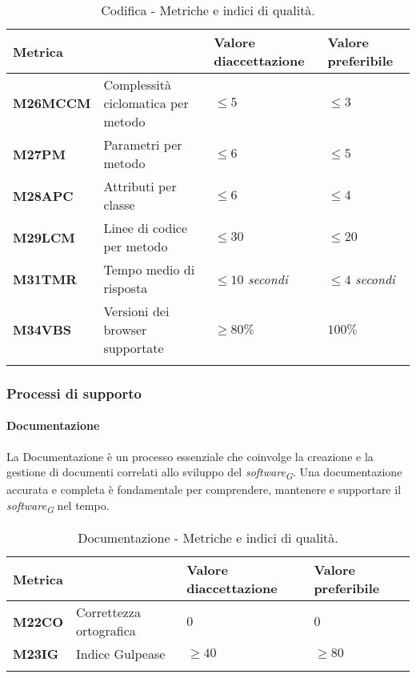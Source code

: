 \begin{longtable}{|C{1.9cm}|L{4cm}|L{2.2cm}|L{2.1cm}|}
    \hline
    \textbf{Metrica} &  & \textbf{Valore di\linebreak accettazione} & {\textbf{Valore \linebreak preferibile}} \\
    \hline \hline

    \textbf{M26MCCM} & Complessità ciclomatica per metodo & $\leq 5$ & $\leq 3$ \\
    \hline

    \textbf{M27PM} & Parametri per metodo & $\leq 6$ & $\leq 5$ \\
    \hline

    \textbf{M28APC} & Attributi per classe & $\leq 6$ & $\leq 4$ \\
    \hline

    \textbf{M29LCM} & Linee di codice per metodo & $\leq 30$ & $\leq 20$ \\
    \hline

    \textbf{M31TMR} & Tempo medio di risposta & $\leq 10$ \textit{secondi}  & $\leq 4$ \textit{secondi} \\
    \hline

    \textbf{M34VBS} & Versioni dei browser supportate & $\geq 80\%$ & $100\%$ \\
    \hline

    \caption{Codifica - Metriche e indici di qualità.}
    \label{tab:metriche}
\end{longtable}

\pagebreak

\subsubsection{Processi di supporto}

\paragraph{Documentazione}
La Documentazione è un processo essenziale che coinvolge la creazione e la gestione di documenti correlati allo sviluppo del \textit{software}\textsubscript{\textit{G}}. Una documentazione accurata e completa è fondamentale per comprendere, mantenere e supportare il \textit{software}\textsubscript{\textit{G}} nel tempo.

\begin{longtable}{|C{1.9cm}|L{4cm}|L{2.2cm}|L{2.1cm}|}
    \hline
    \textbf{Metrica} &  & \textbf{Valore di\linebreak accettazione} & {\textbf{Valore \linebreak preferibile}} \\
    \hline \hline

    \textbf{M22CO} & Correttezza ortografica & $0$ & $0$ \\
    \hline

    \textbf{M23IG} & Indice Gulpease & $\geq 40$ & $\geq 80$ \\
    \hline

    \caption{Documentazione - Metriche e indici di qualità.}
    \label{tab:metriche_testo}
\end{longtable}

